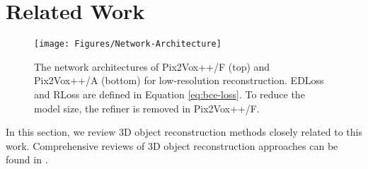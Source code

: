\documentclass[twocolumn]{svjour3}
\begin{document}
\section{Related Work}

\begin{figure*}
  \centering
  \resizebox{\linewidth}{!} {
    \texttt{[image: Figures/Network-Architecture]}
  }
  \caption{The network architectures of Pix2Vox++/F (top) and Pix2Vox++/A (bottom) for low-resolution reconstruction. EDLoss and RLoss are defined in Equation \ref{eq:bce-loss}. To reduce the model size, the refiner is removed in Pix2Vox++/F.}
  \label{fig:network-architecture}
\end{figure*}

In this section, we review 3D object reconstruction methods closely related to this work.
Comprehensive reviews of 3D object reconstruction approaches can be found in \cite{DBLP:journals/corr/abs-1906-06543}.
\end{document}
